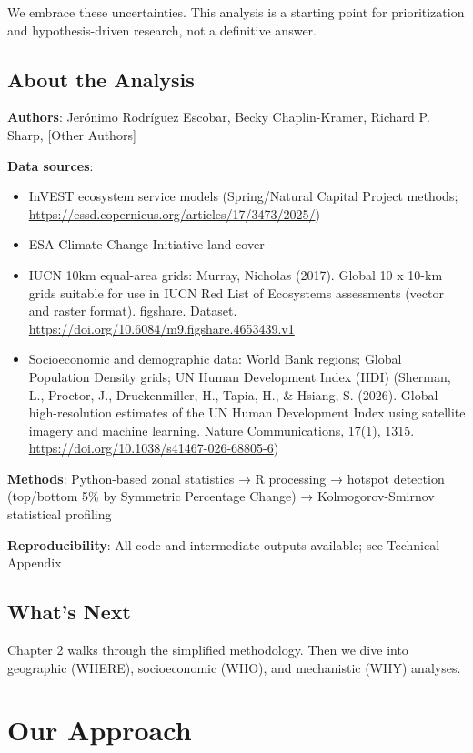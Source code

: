 \documentclass[
  letterpaper,
  DIV=11,
  numbers=noendperiod]{scrreprt}
\providecommand{\tightlist}{%
  \setlength{\itemsep}{0pt}\setlength{\parskip}{0pt}}
\begin{document}
We embrace these uncertainties. This analysis is a starting point for
prioritization and hypothesis-driven research, not a definitive answer.

\section{About the Analysis}\label{about-the-analysis}

\textbf{Authors}: Jerónimo Rodríguez Escobar, Becky Chaplin-Kramer, Richard P. Sharp, [Other Authors]

\textbf{Data sources}:
\begin{itemize}
\tightlist
\item
  InVEST ecosystem service models (Spring/Natural Capital Project methods; \url{https://essd.copernicus.org/articles/17/3473/2025/})
\item
  ESA Climate Change Initiative land cover
\item
  IUCN 10km equal-area grids: Murray, Nicholas (2017). Global 10 x 10-km grids suitable for use in IUCN Red List of Ecosystems assessments (vector and raster format). figshare. Dataset. \url{https://doi.org/10.6084/m9.figshare.4653439.v1}
\item
  Socioeconomic and demographic data: World Bank regions; Global Population Density grids; UN Human Development Index (HDI) (Sherman, L., Proctor, J., Druckenmiller, H., Tapia, H., \& Hsiang, S. (2026). Global high-resolution estimates of the UN Human Development Index using satellite imagery and machine learning. Nature Communications, 17(1), 1315. \url{https://doi.org/10.1038/s41467-026-68805-6})
\end{itemize}

\textbf{Methods}: Python-based zonal statistics → R processing → hotspot
detection (top/bottom 5\% by Symmetric Percentage Change) →
Kolmogorov-Smirnov statistical profiling

\textbf{Reproducibility}: All code and intermediate outputs available;
see Technical Appendix

\section{What's Next}\label{whats-next}

Chapter 2 walks through the simplified methodology. Then we dive into
geographic (WHERE), socioeconomic (WHO), and mechanistic (WHY) analyses.

\chapter{Our Approach}\label{our-approach}
\end{document}
